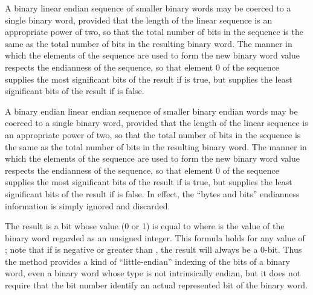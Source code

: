 A binary linear endian sequence of smaller binary words may be coerced to a single binary word,
provided that the length of the linear sequence is an appropriate power of two, so that the
total number of bits in the sequence is the same as the total number of bits in the resulting
binary word.  The manner in which the elements of the sequence are used to form the new binary word value
respects the endianness of the sequence, so that element 0 of the sequence supplies the most significant
bits of the result if  is true, but supplies the least significant
bits of the result if  is false.



A binary endian linear endian sequence of smaller binary endian words may be coerced to a single binary word,
provided that the length of the linear sequence is an appropriate power of two, so that the
total number of bits in the sequence is the same as the total number of bits in the resulting
binary word.  The manner in which the elements of the sequence are used to form the new binary word value
respects the endianness of the sequence, so that element 0 of the sequence supplies the most significant
bits of the result if  is true, but supplies the least significant
bits of the result if  is false.  In effect, the ``bytes and bits'' endianness information
is simply ignored and discarded.



The result is a bit whose value (0 or 1) is equal to 
where  is the value of the binary word regarded as an unsigned integer.  This formula holds
for any value of ; note that if  is negative or greater than ,
the result will always be a 0-bit.  Thus the  method provides a kind of ``little-endian''
indexing of the bits of a binary word, even a binary word whose type is not intrinsically
endian, but it does not require that the bit number identify an actual represented bit of the binary word.

